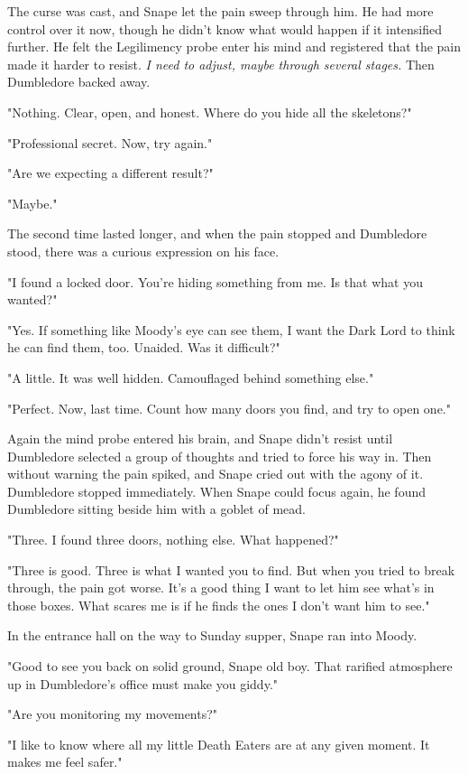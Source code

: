 The curse was cast, and Snape let the pain sweep through him. He had more control over it now, though he didn't know what would happen if it intensified further. He felt the Legilimency probe enter his mind and registered that the pain made it harder to resist. \emph{I need to adjust, maybe through several stages.} Then Dumbledore backed away.

"Nothing. Clear, open, and honest. Where do you hide all the skeletons?"

"Professional secret. Now, try again."

"Are we expecting a different result?"

"Maybe."

The second time lasted longer, and when the pain stopped and Dumbledore stood, there was a curious expression on his face.

"I found a locked door. You're hiding something from me. Is that what you wanted?"

"Yes. If something like Moody's eye can see them, I want the Dark Lord to think he can find them, too. Unaided. Was it difficult?"

"A little. It was well hidden. Camouflaged behind something else."

"Perfect. Now, last time. Count how many doors you find, and try to open one."

Again the mind probe entered his brain, and Snape didn't resist until Dumbledore selected a group of thoughts and tried to force his way in. Then without warning the pain spiked, and Snape cried out with the agony of it. Dumbledore stopped immediately. When Snape could focus again, he found Dumbledore sitting beside him with a goblet of mead.

"Three. I found three doors, nothing else. What happened?"

"Three is good. Three is what I wanted you to find. But when you tried to break through, the pain got worse. It's a good thing I want to let him see what's in those boxes. What scares me is if he finds the ones I don't want him to see."

In the entrance hall on the way to Sunday supper, Snape ran into Moody.

"Good to see you back on solid ground, Snape old boy. That rarified atmosphere up in Dumbledore's office must make you giddy."

"Are you monitoring my movements?"

"I like to know where all my little Death Eaters are at any given moment. It makes me feel safer."

